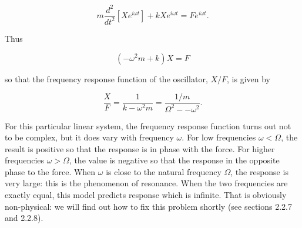   $$m \dfrac{d^2}{dt^2}\left[X e^{i \omega t} \right] + kX e^{i \omega t}=Fe^{i 
  \omega t} . \tag{10}$$ 

  Thus 

  $$(- \omega^2 m+k)X=F \tag{11}$$ 

  so that the frequency response function of the oscillator, $X/F$, is given by 

  $$\dfrac{X}{F} = \dfrac{1}{k-\omega^2 m}=\dfrac{1/m}{\Omega^2 -- \omega^2} 
  \tag{12}. $$ 

  For this particular linear system, the frequency response function turns out 
  not to be complex, but it does vary with frequency $\omega$. For low 
  frequencies $\omega < \Omega$, the result is positive so that the response is 
  in phase with the force. For higher frequencies $\omega > \Omega$, the value 
  is negative so that the response in the opposite phase to the force. When 
  $\omega$ is close to the natural frequency $\Omega$, the response is very 
  large: this is the phenomenon of resonance. When the two frequencies are 
  exactly equal, this model predicts response which is infinite. That is 
  obviously non-physical: we will find out how to fix this problem shortly (see 
  sections 2.2.7 and 2.2.8). 